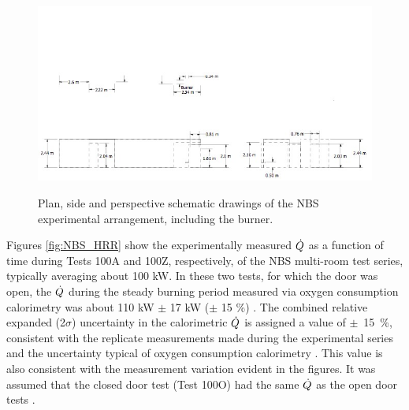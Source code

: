 \begin{figure}[\figoptions{t}]
\begin{center}
\includegraphics[width=8.0in, angle=90]{FIGURES/NBS/NBS_Detailed}\\
\end{center}
\caption{Plan, side and perspective schematic drawings of the NBS experimental arrangement, including the burner.}
 \label{fig:NBS_Detailed}
\end{figure}

Figures \ref{fig:NBS_HRR} show the experimentally measured $\dot{Q}$ as a function of time during Tests 100A and 100Z, respectively, of the NBS multi-room test series, typically averaging about 100 kW.  In these two tests, for which the door was open, the $\dot{Q}$ during the steady burning period measured via oxygen consumption calorimetry was about 110 kW $\pm$ 17 kW ($\pm$ 15 \%) \cite{NRCNUREG1824Experimental}. The combined relative expanded (2$\sigma$) uncertainty in the calorimetric  $\dot{Q}$ is assigned a value of $\pm$~15~\%, consistent with the replicate measurements made during the experimental series and the uncertainty typical of oxygen consumption calorimetry \cite{NRCNUREG1824Experimental}. This value is also consistent with the measurement variation evident in the figures.  It was assumed that the closed door test (Test 100O) had the same $\dot{Q}$ as the open door tests \cite{NRCNUREG1824Experimental}.


